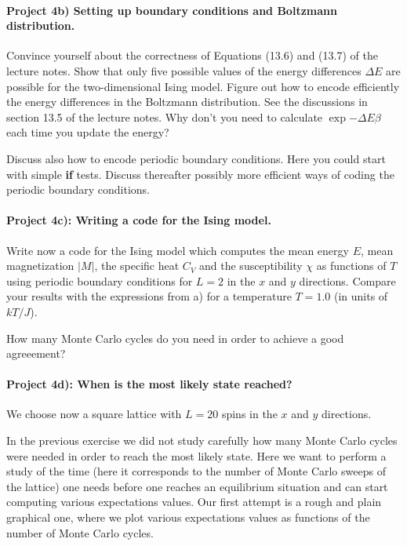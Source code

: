 \documentclass[%
oneside,                 %
final,                   %
10pt]{article}
\begin{document}
\paragraph{Project 4b) Setting up boundary conditions and Boltzmann distribution.}
Convince yourself about the correctness of Equations (13.6) and (13.7)
of the lecture notes. Show that only five possible values of the
energy differences $\Delta E$ are possible for the two-dimensional
Ising model. Figure out how to encode efficiently the energy
differences in the Boltzmann distribution.  See the discussions in
section 13.5 of the lecture notes.  Why don't you need to calculate
$\exp{-\Delta E\beta}$ each time you update the energy?

Discuss also how to encode periodic boundary conditions. Here you
could start with simple \textbf{if} tests. Discuss thereafter possibly   more efficient
ways of coding the periodic boundary conditions.  

\paragraph{Project 4c): Writing a code for the Ising model.}
Write now a code for the Ising model which computes the mean energy 
$E$, mean magnetization 
$\vert M\vert$, the specific heat $C_V$ and the susceptibility $\chi$ 
as functions of  $T$ using periodic boundary conditions for 
$L=2$ in the $x$ and $y$ directions. 
Compare your results with the expressions from a)
for  a  temperature $T=1.0$ (in units of $kT/J$). 

How many Monte Carlo cycles do you need in order to achieve a 
good agreeement?

\paragraph{Project 4d): When is the most likely state reached?}
We choose now a square lattice with $L=20$ spins in the $x$ and $y$ directions. 

In the previous exercise  we did not study carefully how many Monte Carlo cycles were needed in order to reach the most likely state. Here
we want to perform a study of the time (here it corresponds to the number 
of Monte Carlo sweeps of the lattice) one needs before one reaches an equilibrium situation 
and can start computing various expectations values. Our 
first attempt is a rough and plain graphical
one, where we plot various expectations values as functions of the number of Monte Carlo cycles.
\end{document}
